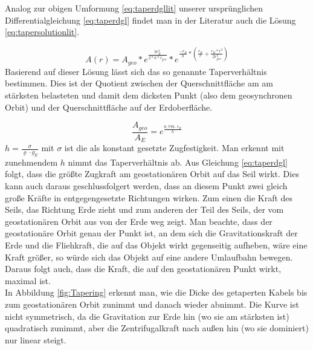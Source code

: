 \documentclass[a4paper, 10pt]{report}
\begin{document}
Analog zur obigen Umformung \ref{eq:taperdgllit} unserer ursprünglichen Differentialgleichung \ref{eq:taperdgl} findet man in der Literatur\cite{PE75} auch die Lösung \ref{eq:tapersolutionlit}.

\begin{equation}
A(r)=A_{geo}*e^\frac{3r_E^2}{2*h*r_{geo}}*e^{\frac{-r_E}{h}*(\frac{r_E}{r}+\frac{r_E*r^2}{2r_{geo}^3})}
\label{eq:tapersolutionlit}
\end{equation}
Basierend auf dieser Lösung lässt sich das so genannte Taperverhältnis bestimmen. Dies ist der Quotient zwischen der Querschnittfläche am am stärksten belasteten und damit dem dicksten Punkt (also dem geosynchronen Orbit) und der Querschnittfläche auf der Erdoberfläche.

\begin{equation}
\frac{A_{geo}}{A_E} = e^\frac{0,776 \cdot r_E}{h}
\label{eq:taperratio}
\end{equation}
$h=\frac{\sigma}{\varrho \cdot g_E}$ mit $\sigma$ ist die als konstant gesetzte Zugfestigkeit. Man erkennt mit zunehmendem $h$ nimmt das Taperverhältnis ab.
Aus Gleichung \ref{eq:taperdgl} folgt, dass die größte Zugkraft am geostationären Orbit auf das Seil wirkt. Dies kann auch daraus geschlussfolgert werden, dass an diesem Punkt zwei gleich große Kräfte in entgegengesetzte Richtungen wirken. Zum einen die Kraft des Seils, das Richtung Erde zieht und zum anderen der Teil des Seils, der vom geostationären Orbit aus von der Erde weg zeigt. Man beachte, dass der geostationäre Orbit genau der Punkt ist, an dem sich die Gravitationskraft der Erde und die Fliehkraft, die auf das Objekt wirkt gegenseitig aufheben, wäre eine Kraft größer, so würde sich das Objekt auf eine andere Umlaufbahn bewegen. Daraus folgt auch, dass die Kraft, die auf den geostationären Punkt wirkt, maximal ist. \\
In Abbildung \ref{fig:Tapering} erkennt man, wie die Dicke des getaperten Kabels bis zum geostationären Orbit zunimmt und danach wieder abnimmt. Die Kurve ist nicht symmetrisch, da die Gravitation zur Erde hin (wo sie am stärksten ist) quadratisch zunimmt, aber die Zentrifugalkraft nach außen hin (wo sie dominiert) nur linear steigt.
\end{document}
